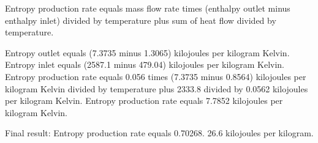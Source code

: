 Entropy production rate equals mass flow rate times (enthalpy outlet minus enthalpy inlet) divided by temperature plus sum of heat flow divided by temperature.  

Entropy outlet equals (7.3735 minus 1.3065) kilojoules per kilogram Kelvin.  
Entropy inlet equals (2587.1 minus 479.04) kilojoules per kilogram Kelvin.  
Entropy production rate equals 0.056 times (7.3735 minus 0.8564) kilojoules per kilogram Kelvin divided by temperature plus 2333.8 divided by 0.0562 kilojoules per kilogram Kelvin.  
Entropy production rate equals 7.7852 kilojoules per kilogram Kelvin.  

Final result:  
Entropy production rate equals 0.70268.  
26.6 kilojoules per kilogram.